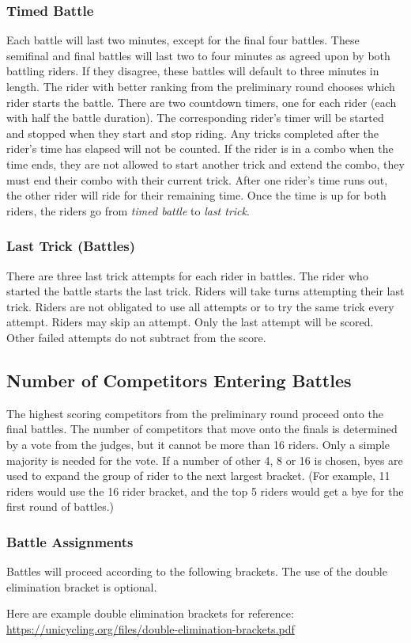 \subsubsection{Timed Battle}
Each battle will last two minutes, except for the final four battles.
These semifinal and final battles will last two to four minutes as agreed upon by both battling riders.
If they disagree, these battles will default to three minutes in length.
The rider with better ranking from the preliminary round chooses which rider starts the battle.
There are two countdown timers, one for each rider (each with half the battle duration).
The corresponding rider's timer will be started and stopped when they start and stop riding.
Any tricks completed after the rider's time has elapsed will not be counted.
If the rider is in a combo when the time ends, they are not allowed to start another trick and extend the combo, they must end their combo with their current trick.
After one rider's time runs out, the other rider will ride for their remaining time.
Once the time is up for both riders, the riders go from \textit{timed battle} to \textit{last trick}.

\subsubsection{Last Trick (Battles)}
There are three last trick attempts for each rider in battles.
The rider who started the battle starts the last trick.
Riders will take turns attempting their last trick.
Riders are not obligated to use all attempts or to try the same trick every attempt.
Riders may skip an attempt.
Only the last attempt will be scored.
Other failed attempts do not subtract from the score.

\subsection{Number of Competitors Entering Battles}
The highest scoring competitors from the preliminary round proceed onto the final battles.
The number of competitors that move onto the finals is determined by a vote from the judges, but it cannot be more than 16 riders.
Only a simple majority is needed for the vote.
If a number of other 4, 8 or 16 is chosen, byes are used to expand the group of rider to the next largest bracket.
(For example, 11 riders would use the 16 rider bracket, and the top 5 riders would get a bye for the first round of battles.)

\subsubsection{Battle Assignments}
Battles will proceed according to the following brackets.
The use of the double elimination bracket is optional.

Here are example double elimination brackets for reference: \url{https://unicycling.org/files/double-elimination-brackets.pdf}
